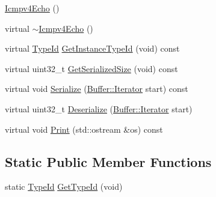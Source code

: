 \begin{DoxyCompactItemize}
\hyperlink{classns3_1_1Icmpv4Echo_a685bf15ce70711da6cd51806b6d1227e}{Icmpv4\+Echo} ()
\item 
virtual \hyperlink{classns3_1_1Icmpv4Echo_a91b70617b84fe0c33ecf21367a3a21a6}{$\sim$\+Icmpv4\+Echo} ()
\item 
virtual \hyperlink{classns3_1_1TypeId}{Type\+Id} \hyperlink{classns3_1_1Icmpv4Echo_a5250ca43bf3be40cd49d23bf2388cb75}{Get\+Instance\+Type\+Id} (void) const 
\item 
virtual uint32\+\_\+t \hyperlink{classns3_1_1Icmpv4Echo_a5e38ed2b78da1dd91340abd47801a528}{Get\+Serialized\+Size} (void) const 
\item 
virtual void \hyperlink{classns3_1_1Icmpv4Echo_ad6652457d16fed5589a6e668da6f78f6}{Serialize} (\hyperlink{classns3_1_1Buffer_1_1Iterator}{Buffer\+::\+Iterator} start) const 
\item 
virtual uint32\+\_\+t \hyperlink{classns3_1_1Icmpv4Echo_ad794af55112b9e786094a843bb758bb9}{Deserialize} (\hyperlink{classns3_1_1Buffer_1_1Iterator}{Buffer\+::\+Iterator} start)
\item 
virtual void \hyperlink{classns3_1_1Icmpv4Echo_a4eaf004a697e3edcd4d45c2cde11215f}{Print} (std\+::ostream \&os) const 
\end{DoxyCompactItemize}
\subsection*{Static Public Member Functions}
\begin{DoxyCompactItemize}
\item 
static \hyperlink{classns3_1_1TypeId}{Type\+Id} \hyperlink{classns3_1_1Icmpv4Echo_ab925fa5b363ccc9e17f92bbfb8fb9771}{Get\+Type\+Id} (void)
\end{DoxyCompactItemize}
